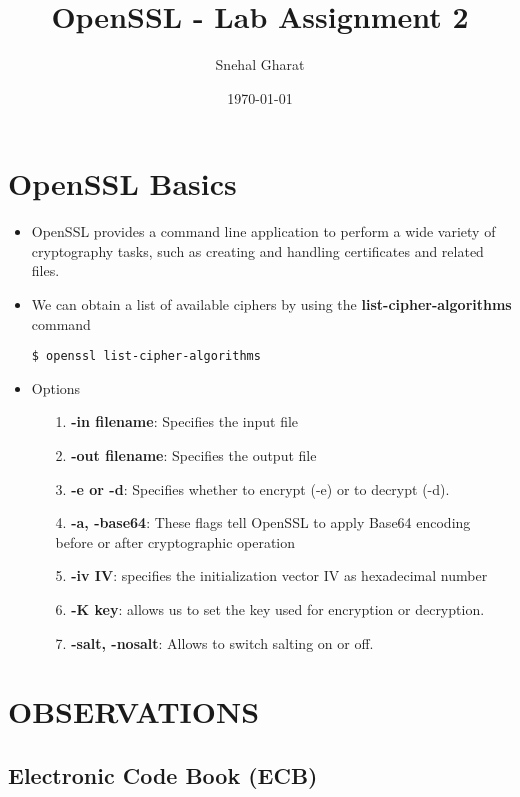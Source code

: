 \documentclass[12pt, a4]{article}
\begin{document}
\title{OpenSSL - Lab Assignment 2}
\author{Snehal Gharat}
\date{\today}
\maketitle

\section{OpenSSL Basics}
\begin{itemize}
\item OpenSSL provides a command line application to perform a wide variety of cryptography tasks, such as creating and handling certificates and related files.
\item We can obtain a list of available ciphers by using the \textbf{list-cipher-algorithms}  command  
\begin{lstlisting}
$ openssl list-cipher-algorithms
\end{lstlisting}
\item Options
\begin{itemize}
\item[1.] \textbf{-in filename}: Specifies the input file 
\item[2.] \textbf{-out filename}: Specifies the output file
\item[3.] \textbf{-e or -d}: Specifies whether to encrypt (-e) or to decrypt (-d).
\item[4.] \textbf{-a, -base64}: These flags tell OpenSSL to apply Base64 encoding before or after cryptographic operation
\item[5.] \textbf{-iv IV}: specifies the initialization vector IV as hexadecimal number
\item[6.] \textbf{-K key}: allows us to set the key used for encryption or decryption.
\item[7.] \textbf{-salt, -nosalt}: Allows to switch salting on or off.
\end{itemize}
\end{itemize}

\section{OBSERVATIONS}
\subsection{Electronic Code Book (ECB)}
\end{document}
